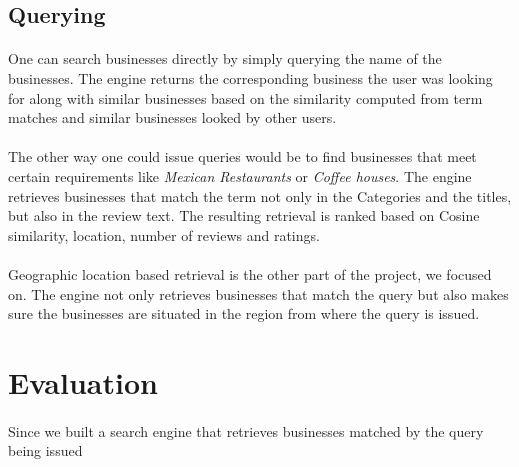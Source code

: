 \documentclass[paper=letter, fontsize=15pt]{article} %
\begin{document}
\subsection{Querying}
\paragraph{}One can search businesses directly by simply querying the name of the businesses. The engine returns the corresponding business the user was looking for along with similar businesses based on the similarity computed from term matches and similar businesses looked by other users. 
\paragraph{}The other way one could issue queries would be to find businesses that meet certain requirements like \textit{Mexican Restaurants} or \textit{Coffee houses}. The engine retrieves businesses that match the term not only in the Categories and the titles, but also in the review text. The resulting retrieval is ranked based on Cosine similarity, location, number of reviews and ratings.
\paragraph{}Geographic location based retrieval is the other part of the project, we focused on. The engine not only retrieves businesses that match the query but also makes sure the businesses are situated in the region from where the query is issued. 
\section{Evaluation}
\paragraph{}Since we built a search engine that retrieves businesses matched by the query being issued



      

\end{document}
